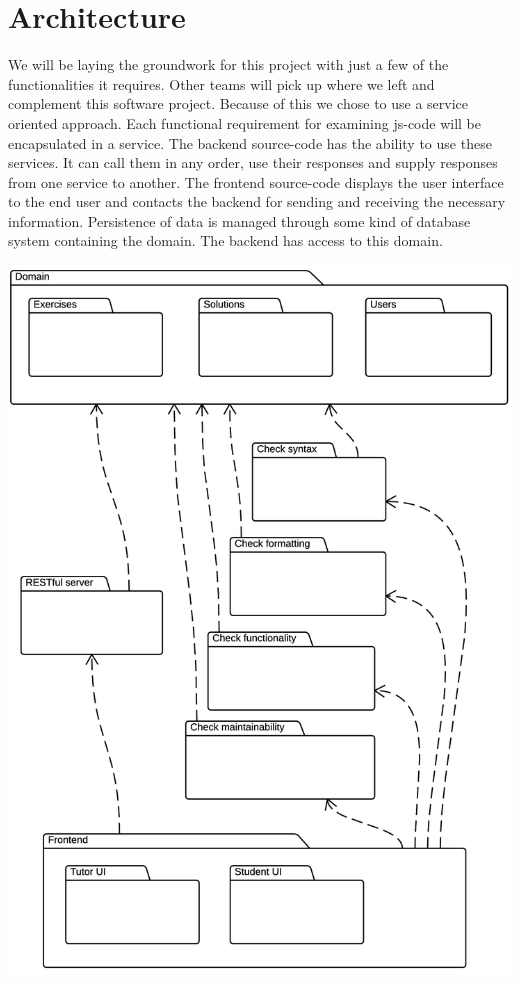 
\section{Architecture}
We will be laying the groundwork for this project
with just a few of the functionalities it requires.
Other teams will pick up where we left and complement this software project.
Because of this we chose to use a service oriented approach.
Each functional requirement for examining \gls{js-code}
will be encapsulated in a service.
The backend \gls{source-code} has the ability to use these services.
It can call them in any order, use their responses
and supply responses from one service to another.
The frontend \gls{source-code} displays the user interface to the end user
and contacts the backend for sending and receiving the necessary information.
Persistence of data is managed through some kind of database system
containing the domain.
The backend has access to this domain.

\includegraphics[scale=0.75] {diagrams-images/architecture}


